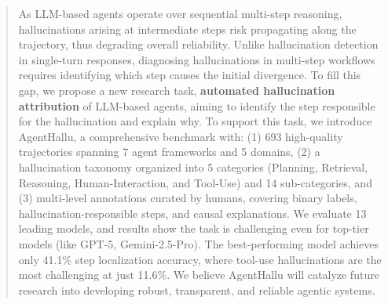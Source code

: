 \begin{abstract}
As LLM-based agents operate over sequential multi-step reasoning, hallucinations arising at intermediate steps risk propagating along the trajectory, thus degrading overall reliability.
Unlike hallucination detection in single-turn responses, diagnosing hallucinations in multi-step workflows requires identifying which step causes the initial divergence. To fill this gap, we propose a new research task, \textbf{automated hallucination attribution} of LLM-based agents, aiming to identify the step responsible for the hallucination and explain why. To support this task, we introduce AgentHallu, a comprehensive benchmark with: (1) 693 high-quality trajectories spanning 7 agent frameworks and 5 domains, (2) a hallucination taxonomy organized into 5 categories (Planning, Retrieval, Reasoning, Human-Interaction, and Tool-Use) and 14 sub-categories, and (3) multi-level annotations curated by humans, covering binary labels, hallucination-responsible steps, and causal explanations.
We evaluate 13 leading models, and results show the task is challenging even for top-tier models (like GPT-5, Gemini-2.5-Pro). 
The best-performing model achieves only 41.1\% step localization accuracy, where tool-use hallucinations are the most challenging at just 11.6\%.
We believe AgentHallu will catalyze future research into developing robust, transparent, and reliable agentic systems.
\end{abstract}